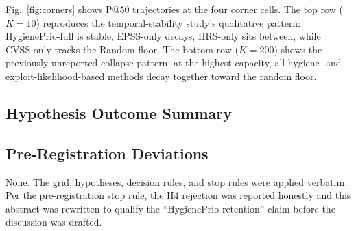 Fig.~\ref{fig:corners} shows P@50 trajectories at the four corner
cells. The top row ($K = 10$) reproduces the temporal-stability study's qualitative pattern:
HygienePrio-full is stable, EPSS-only decays, HRS-only sits between,
while CVSS-only tracks the Random floor. The bottom row ($K = 200$) shows the previously
unreported collapse pattern: at the highest capacity, all hygiene-
and exploit-likelihood-based methods decay together toward the
random floor.

\subsection{Hypothesis Outcome Summary}



\subsection{Pre-Registration Deviations}

None. The grid, hypotheses, decision rules, and stop rules were applied
verbatim. Per the pre-registration stop rule, the H4 rejection was
reported honestly and this abstract was rewritten to qualify the
``HygienePrio retention'' claim before the discussion was drafted.

